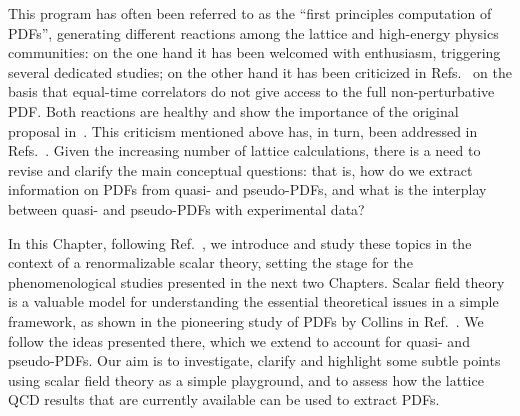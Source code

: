 %
This program has often been referred to as the ``first
principles computation of PDFs'', generating different reactions among the
lattice and high-energy physics communities: on the one hand it has been
welcomed with enthusiasm, triggering several dedicated studies; on the other
hand it has been criticized in Refs.~\cite{Rossi:2017muf,Rossi:2018zkn} on the
basis that equal-time correlators do not give access to the full
non-perturbative PDF. Both reactions are healthy and show the importance of the
original proposal in~\cite{PhysRevLett.110.262002}. This criticism mentioned
above has, in turn, been addressed in
Refs.~\cite{Radyushkin:2018nbf,Karpie:2018zaz}. Given the increasing number of
lattice calculations, there is a need to revise and clarify the main conceptual
questions: that is, how do we extract information on PDFs from quasi- and
pseudo-PDFs, and what is the interplay between quasi- and pseudo-PDFs with
experimental data?

In this Chapter, following Ref.~\cite{DelDebbio:2020cbz}, we introduce and study these topics in the context of a renormalizable scalar
theory, setting the stage for the phenomenological studies presented in the next two Chapters.
Scalar field theory is a valuable model for understanding the essential
theoretical issues in a simple framework, as shown in the pioneering study of
PDFs by Collins in Ref.~\cite{Collins:1980ui}. We follow the ideas presented
there, which we extend to account for quasi- and pseudo-PDFs. Our aim is to
investigate, clarify and highlight some subtle points using scalar field theory
as a simple playground, and to assess how the lattice QCD results that are
currently available can be used to extract PDFs. 

